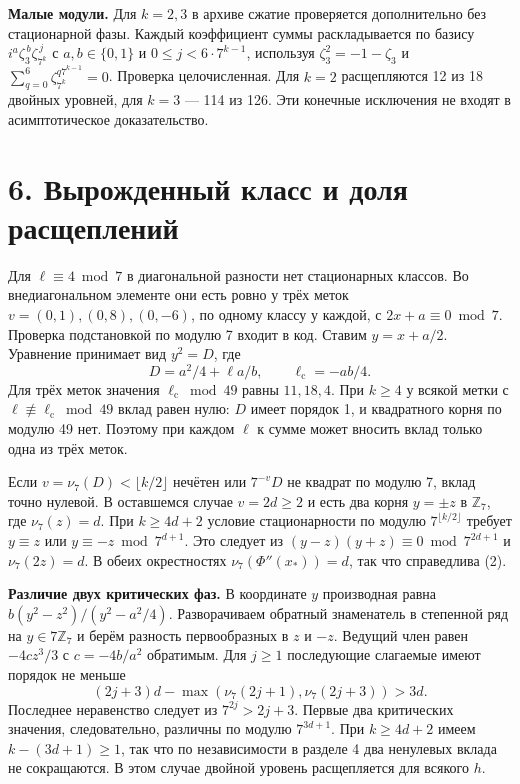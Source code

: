 \documentclass[11pt,a4paper]{article}
\newcommand{\sect}[1]{\section*{\sffamily\color{ink}#1}}
\newcommand{\subt}[1]{\par\medskip\noindent\textbf{#1.}\quad}
\newcommand{\zp}{\mathbb Z_7}
\begin{document}
\subt{Малые модули}
Для \(k=2,3\) в архиве сжатие проверяется дополнительно без стационарной фазы. Каждый коэффициент суммы раскладывается по базису
\(i^a\zeta_3^{\,b}\zeta_{7^k}^{\,j}\) с \(a,b\in\{0,1\}\) и
\(0\le j<6\cdot7^{k-1}\), используя
\(\zeta_3^2=-1-\zeta_3\) и
\(\sum_{q=0}^6\zeta_{7^k}^{q7^{k-1}}=0\).
Проверка целочисленная. Для \(k=2\) расщепляются 12 из 18 двойных уровней, для \(k=3\) --- 114 из 126. Эти конечные исключения не входят в асимптотическое доказательство.
\newpage
\sect{6. Вырожденный класс и доля расщеплений}
Для \(\ell\equiv4\bmod7\) в диагональной разности нет стационарных классов. Во внедиагональном элементе они есть ровно у трёх меток \(v=(0,1),(0,8),(0,-6)\), по одному классу у каждой, с \(2x+a\equiv0\bmod7\). Проверка подстановкой по модулю 7 входит в код. Ставим \(y=x+a/2\). Уравнение принимает вид \(y^2=D\), где
\[
             D=a^2/4+\ell a/b,\qquad
             \ell_{\mathrm c}=-ab/4 .
\]
Для трёх меток значения \(\ell_{\mathrm c}\bmod49\) равны \(11,18,4\). При \(k\ge4\) у всякой метки с \(\ell\not\equiv\ell_{\mathrm c}\bmod49\) вклад равен нулю: \(D\) имеет порядок 1, и квадратного корня по модулю 49 нет. Поэтому при каждом \(\ell\) к сумме может вносить вклад только одна из трёх меток.

Если \(v=\nu_7(D)<\lfloor k/2\rfloor\) нечётен или \(7^{-v}D\) не квадрат по модулю 7, вклад точно нулевой. В оставшемся случае \(v=2d\ge2\) и есть два корня \(y=\pm z\) в \(\zp\), где \(\nu_7(z)=d\). При \(k\ge4d+2\) условие стационарности по модулю \(7^{\lfloor k/2\rfloor}\) требует \(y\equiv z\) или \(y\equiv-z\bmod7^{d+1}\). Это следует из \((y-z)(y+z)\equiv0\bmod7^{2d+1}\) и \(\nu_7(2z)=d\). В обеих окрестностях \(\nu_7(\Phi''(x_*))=d\), так что справедлива (2).

\subt{Различие двух критических фаз}
В координате \(y\) производная равна \(b(y^2-z^2)/(y^2-a^2/4)\). Разворачиваем обратный знаменатель в степенной ряд на \(y\in7\zp\) и берём разность первообразных в \(z\) и \(-z\). Ведущий член равен \(-4c z^3/3\) с \(c=-4b/a^2\) обратимым. Для \(j\ge1\) последующие слагаемые имеют порядок не меньше
\[
 (2j+3)d-\max(\nu_7(2j+1),\nu_7(2j+3))>3d.
\]
Последнее неравенство следует из \(7^{2j}>2j+3\). Первые два критических значения, следовательно, различны по модулю \(7^{3d+1}\). При \(k\ge4d+2\) имеем \(k-(3d+1)\ge1\), так что по независимости в разделе 4 два ненулевых вклада не сокращаются. В этом случае двойной уровень расщепляется для всякого \(h\).
\end{document}
